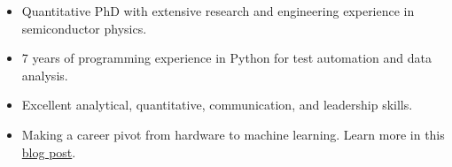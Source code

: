 

\begin{cvparagraph}

\begin{itemize}[leftmargin=*, noitemsep]
    \item Quantitative PhD with extensive research and engineering experience in semiconductor physics. 
    \item 7 years of programming experience in Python for test automation and data analysis. 
    \item Excellent analytical, quantitative, communication, and leadership skills. 
    \item Making a career pivot from hardware to machine learning. Learn more in this \href{https://medium.com/@mpchang17/making-the-leap-from-hardware-to-machine-learning-d85853b59a05}{blog post}.
\end{itemize}
\end{cvparagraph}
